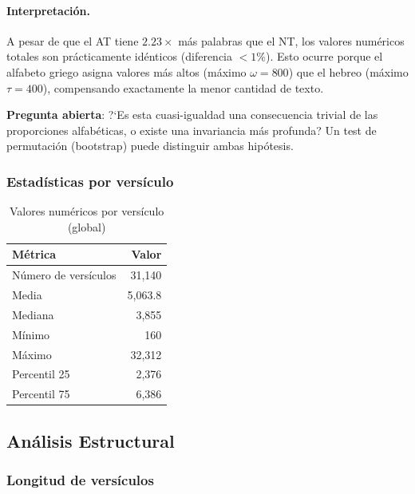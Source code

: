 \documentclass[12pt,a4paper]{article}
\begin{document}
\paragraph{Interpretaci\'on.}
A pesar de que el AT tiene $2.23\times$ m\'as palabras que el NT, los valores
num\'ericos totales son pr\'acticamente id\'enticos (diferencia $< 1\%$).
Esto ocurre porque el alfabeto griego asigna valores m\'as altos
(m\'aximo $\omega = 800$) que el hebreo (m\'aximo $\tau = 400$),
compensando exactamente la menor cantidad de texto.

\textbf{Pregunta abierta}: ?`Es esta cuasi-igualdad una consecuencia trivial
de las proporciones alfab\'eticas, o existe una invariancia m\'as profunda?
Un test de permutaci\'on (bootstrap) puede distinguir ambas hip\'otesis.

\subsubsection{Estad\'isticas por vers\'iculo}

\begin{table}[H]
\centering
\caption{Valores num\'ericos por vers\'iculo (global)}
\label{tab:numverse}
\begin{tabular}{lr}
\toprule
\textbf{M\'etrica} & \textbf{Valor} \\
\midrule
N\'umero de vers\'iculos & 31,140 \\
Media              & 5,063.8 \\
Mediana            & 3,855 \\
M\'inimo           & 160 \\
M\'aximo           & 32,312 \\
Percentil 25       & 2,376 \\
Percentil 75       & 6,386 \\
\bottomrule
\end{tabular}
\end{table}


\subsection{An\'alisis Estructural}

\subsubsection{Longitud de vers\'iculos}
\end{document}
